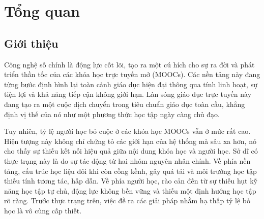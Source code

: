 




\chapter{Tổng quan}
\label{chap:chap1}
\section{Giới thiệu}
Công nghệ số chính là động lực cốt lõi, tạo ra một cú hích cho sự ra đời và phát triển thần tốc của các khóa học trực tuyến mở (MOOCs). Các nền tảng này đang từng bước định hình lại toàn cảnh giáo dục hiện đại thông qua tính linh hoạt, sự tiện lợi và khả năng tiếp cận không giới hạn. Làn sóng giáo dục trực tuyến này đang tạo ra một cuộc dịch chuyển trong tiêu chuẩn giáo dục toàn cầu, khẳng định vị thế của nó như một phương thức học tập ngày càng chủ đạo.

Tuy nhiên, tỷ lệ người học bỏ cuộc ở các khóa học MOOCs vẫn ở mức rất cao. Hiện tượng này không chỉ chứng tỏ các giới hạn của hệ thống mà sâu xa hơn, nó cho thấy sự thiếu kết nối hiệu quả giữa nội dung khóa học và người học. Sở dĩ có thực trạng này là do sự tác động từ hai nhóm nguyên nhân chính. Về phía nền tảng, cấu trúc học liệu đôi khi còn cồng kềnh, gây quá tải và môi trường học tập thiếu tính tương tác, hấp dẫn. Về phía người học, rào cản đến từ sự thiếu hụt kỹ năng học tập tự chủ, động lực không bền vững và thiếu một định hướng học tập rõ ràng. Trước thực trạng trên, việc đề ra các giải pháp nhằm hạ thấp tỷ lệ bỏ học là vô cùng cấp thiết.

